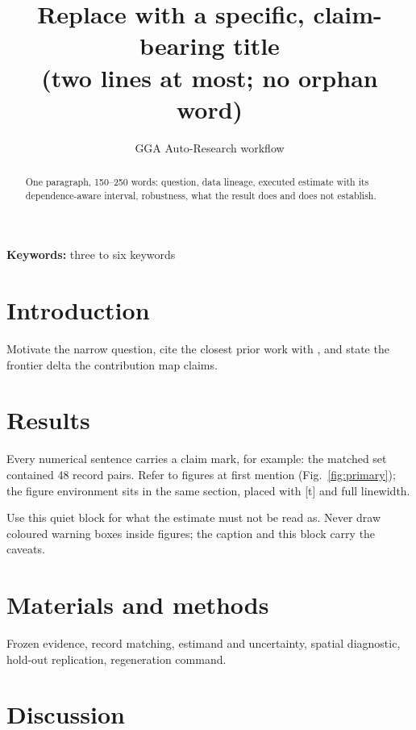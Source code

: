 \documentclass[11pt]{article}
\title{Replace with a specific, claim-bearing title\\ (two lines at most; no orphan word)}
\author{GGA Auto-Research workflow}
\date{}
\begin{document}
\maketitle
\gradeline

\begin{abstract}
One paragraph, 150--250 words: question, data lineage, executed estimate with
its dependence-aware interval, robustness, what the
result does and does not establish.
\end{abstract}

\noindent\textbf{Keywords:} three to six keywords

\section{Introduction}
Motivate the narrow question, cite the closest prior work with \cite{lit01},
and state the frontier delta the contribution map claims.

\section{Results}
Every numerical sentence carries a claim mark, for example: the matched set
contained 48 record pairs.  Refer to figures at
first mention (Fig.~\ref{fig:primary}); the figure environment sits in the
same section, placed with [t] and full linewidth.


\begin{boundary}
Use this quiet block for what the estimate must not be read as.  Never draw
coloured warning boxes inside figures; the caption and this block carry the
caveats.
\end{boundary}

\section{Materials and methods}
Frozen evidence, record matching, estimand and uncertainty, spatial
diagnostic, hold-out replication, regeneration command.

\section{Discussion}
\end{document}
